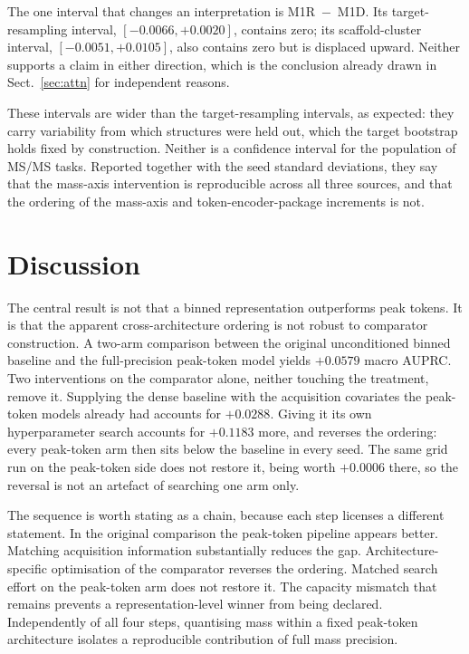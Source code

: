 \documentclass[11pt]{article}
\begin{document}
The one interval that changes an interpretation is M1R~$-$~M1D. Its
target-resampling interval, $[-0.0066, +0.0020]$, contains zero; its
scaffold-cluster interval, $[-0.0051, +0.0105]$, also contains zero but is
displaced upward. Neither supports a claim in either direction, which is the
conclusion already drawn in Sect.~\ref{sec:attn} for independent reasons.

These intervals are wider than the target-resampling intervals, as expected: they carry variability from which structures were held out, which the target bootstrap holds fixed by construction. Neither is a confidence interval for the population of MS/MS tasks. Reported together with the seed standard deviations, they say that the mass-axis intervention is reproducible across all three sources, and that the ordering of the mass-axis and token-encoder-package increments is not.

\section*{Discussion}
The central result is not that a binned representation outperforms peak tokens. It is that the apparent cross-architecture ordering is not robust to comparator construction. A two-arm comparison between the original unconditioned binned baseline and the full-precision peak-token model yields $+0.0579$ macro AUPRC. Two interventions on the comparator alone, neither touching the treatment, remove it. Supplying the dense baseline with the acquisition covariates the peak-token models already had accounts for $+0.0288$. Giving it its own hyperparameter search accounts for $+0.1183$ more, and reverses the ordering: every peak-token arm then sits below the baseline in every seed. The same grid run on the peak-token side does not restore it, being worth $+0.0006$ there, so the reversal is not an artefact of searching one arm only.

The sequence is worth stating as a chain, because each step licenses a different
statement. In the original comparison the peak-token pipeline appears better.
Matching acquisition information substantially reduces the gap. Architecture-specific
optimisation of the comparator reverses the ordering. Matched search effort on the
peak-token arm does not restore it. The capacity mismatch that remains prevents a
representation-level winner from being declared. Independently of all four steps,
quantising mass within a fixed peak-token architecture isolates a reproducible
contribution of full mass precision.
\end{document}
